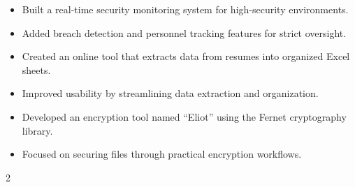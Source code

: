 \documentclass[10pt,a4paper,ragged2e]{maltacv}
\begin{document}
\divider

\begin{itemize}
  \item Built a real-time security monitoring system for high-security environments.
  \item Added breach detection and personnel tracking features for strict oversight.
\end{itemize}

\divider

\begin{itemize}
  \item Created an online tool that extracts data from resumes into organized Excel sheets.
  \item Improved usability by streamlining data extraction and organization.
\end{itemize}

\divider

\begin{itemize}
  \item Developed an encryption tool named ``Eliot'' using the Fernet cryptography library.
  \item Focused on securing files through practical encryption workflows.
\end{itemize}

\medskip
{}
\medskip
\begin{multicols}{2}

  \vfill\null
  \columnbreak

\end{multicols}
\end{document}
